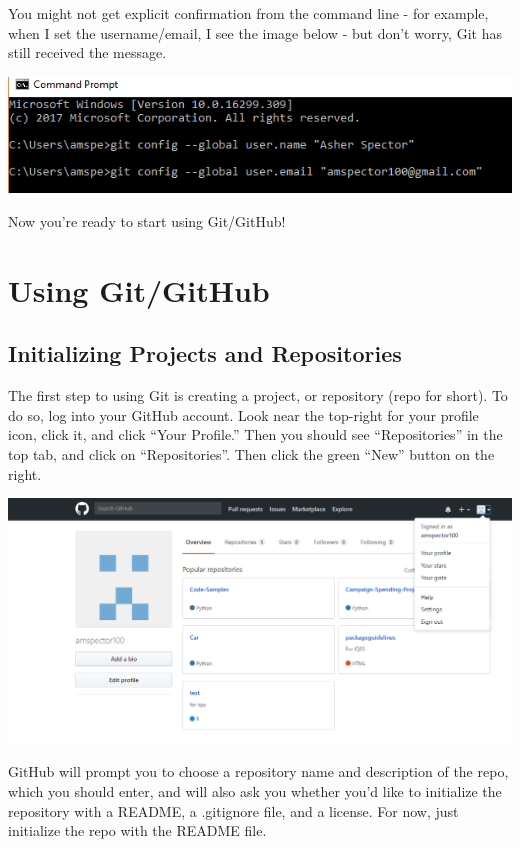 \documentclass[
]{book}
\begin{document}
You might not get explicit confirmation from the command line - for example, when I set the username/email, I see the image below - but don't worry, Git has still received the message.

\includegraphics{images/configglobals.PNG}

Now you're ready to start using Git/GitHub!

\hypertarget{using-gitgithub}{%
\section{Using Git/GitHub}\label{using-gitgithub}}

\hypertarget{initializing-projects-and-repositories}{%
\subsection{Initializing Projects and Repositories}\label{initializing-projects-and-repositories}}

The first step to using Git is creating a project, or repository (repo for short). To do so, log into your GitHub account. Look near the top-right for your profile icon, click it, and click ``Your Profile.'' Then you should see ``Repositories'' in the top tab, and click on ``Repositories''. Then click the green ``New'' button on the right.

\includegraphics{images/gitdashboard.PNG}

GitHub will prompt you to choose a repository name and description of the repo, which you should enter, and will also ask you whether you'd like to initialize the repository with a README, a .gitignore file, and a license. For now, just initialize the repo with the README file.
\end{document}
